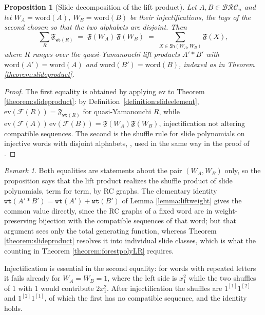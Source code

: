 \documentclass{amsart}
\newtheorem{proposition}[lemma]{Proposition}
\theoremstyle{definition}
\theoremstyle{remark}
\newtheorem*{remark}{Remark}
\numberwithin{equation}{subsection}
\newcommand{\slel}{\mathcal{F}}
\newcommand{\wtt}{\mathtt{wt}}
\newcommand{\BRC}{\mathcal{BRC}}
\begin{document}
\begin{proposition}[Slide decomposition of the lift product]\label{proposition:liftshufflewords}
Let $A,B\in\BRC_n$ and let $W_A=\overline{\mathrm{word}(A)}$, $W_B=\overline{\mathrm{word}(B)}$ be their injectifications, the tags of the second chosen so that the two alphabets are disjoint. Then
$$\sum_{R}\mathfrak{F}_{\wtt(R)}\;=\;\mathfrak{F}(W_A)\,\mathfrak{F}(W_B)\;=\;\sum_{X\in\mathsf{Sh}(W_A,W_B)}\mathfrak{F}(X),$$
where $R$ ranges over the quasi-Yamanouchi lift products $A'*B'$ with $\mathrm{word}(A')=\mathrm{word}(A)$ and $\mathrm{word}(B')=\mathrm{word}(B)$, indexed as in Theorem \ref{theorem:slideproduct}.
\end{proposition}
\begin{proof}
The first equality is obtained by applying $\mathrm{ev}$ to Theorem \ref{theorem:slideproduct}: by Definition~\ref{definition:slideelement}, $\mathrm{ev}(\slel(R))=\mathfrak{F}_{\wtt(R)}$ for quasi-Yamanouchi $R$, while $\mathrm{ev}(\slel(A))\,\mathrm{ev}(\slel(B))=\mathfrak{F}(W_A)\mathfrak{F}(W_B)$, injectification not altering compatible sequences. The second is the shuffle rule for slide polynomials on injective words with disjoint alphabets, \cite[\S3.4]{nadeau2024forest}, used in the same way in the proof of \cite[Theorem~6.3]{nadeau2024forest}.
\end{proof}

\begin{remark}
Both equalities are statements about the pair $(W_A,W_B)$ only, so the proposition says that the lift product realizes the shuffle product of slide polynomials, term for term, by RC graphs. The elementary identity $\wtt(A'*B')=\wtt(A')+\wtt(B')$ of Lemma \ref{lemma:liftweight} gives the common value directly, since the RC graphs of a fixed word are in weight-preserving bijection with the compatible sequences of that word; but that argument sees only the total generating function, whereas Theorem \ref{theorem:slideproduct} resolves it into individual slide classes, which is what the counting in Theorem \ref{theorem:forestpolyLR} requires.

Injectification is essential in the second equality: for words with repeated letters it fails already for $W_A=W_B=1$, where the left side is $x_1^2$ while the two shuffles of $1$ with $1$ would contribute $2x_1^2$. After injectification the shuffles are $1^{[1]}1^{[2]}$ and $1^{[2]}1^{[1]}$, of which the first has no compatible sequence, and the identity holds.
\end{remark}
\end{document}
